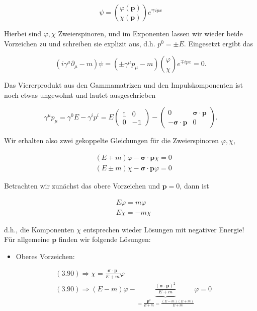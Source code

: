 \documentclass[10pt, letterpaper]{article}
\begin{document}
$$
\psi=\binom{\varphi(\mathbf{p})}{\chi(\mathbf{p})} e^{\mp i p x}
$$

Hierbei sind $\varphi, \chi$ Zweierspinoren, und im Exponenten lassen wir wieder beide Vorzeichen zu und schreiben sie explizit aus, d.h. $p^{0}= \pm E$. Eingesetzt ergibt das

$$
\left(i \gamma^{\mu} \partial_{\mu}-m\right) \psi=\left( \pm \gamma^{\mu} p_{\mu}-m\right)\binom{\varphi}{\chi} e^{\mp i p x}=0 .
$$

Das Viererprodukt aus den Gammamatrizen und den Impulskomponenten ist noch etwas ungewohnt und lautet ausgeschrieben

$$
\gamma^{\mu} p_{\mu}=\gamma^{0} E-\gamma^{i} p^{i}=E\left(\begin{array}{cc}
\mathbb{1} & 0 \\
0 & -\mathbb{1}
\end{array}\right)-\left(\begin{array}{cc}
0 & \boldsymbol{\sigma} \cdot \mathbf{p} \\
-\boldsymbol{\sigma} \cdot \mathbf{p} & 0
\end{array}\right) .
$$

Wir erhalten also zwei gekoppelte Gleichungen für die Zweierspinoren $\varphi, \chi$,

$$
\begin{aligned}
& (E \mp m) \varphi-\boldsymbol{\sigma} \cdot \mathbf{p} \chi=0 \\
& (E \pm m) \chi-\boldsymbol{\sigma} \cdot \mathbf{p} \varphi=0
\end{aligned}
$$

Betrachten wir zunächst das obere Vorzeichen und $\mathbf{p}=0$, dann ist

$$
\begin{aligned}
& E \varphi=m \varphi \\
& E \chi=-m \chi
\end{aligned}
$$

d.h., die Komponenten $\chi$ entsprechen wieder Lösungen mit negativer Energie! Für allgemeine $\mathbf{p}$ finden wir folgende Lösungen:

\begin{itemize}
  \item Oberes Vorzeichen:
\end{itemize}

$$
\begin{aligned}
& (3.90) \Rightarrow \chi=\frac{\boldsymbol{\sigma} \cdot \mathbf{p}}{E+m} \varphi \\
& (3.90) \Rightarrow(E-m) \varphi-\underbrace{\frac{(\boldsymbol{\sigma} \cdot \mathbf{p})^{2}}{E+m}}_{=\frac{\mathbf{p}^{2}}{E+m}=\frac{(E-m)(E+m)}{E+m}} \varphi=0
\end{aligned}
$$
\end{document}
